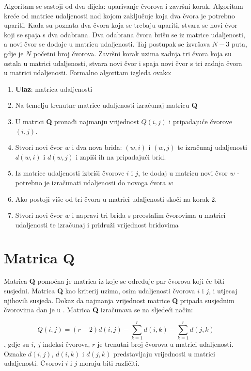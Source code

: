 \documentclass[times, utf8, seminar, numeric]{fer}
\begin{document}
Algoritam se sastoji od dva dijela: uparivanje čvorova i završni korak. Algoritam kreće od matrice udaljenosti nad kojom zaključuje koja dva čvora je potrebno upariti. Kada su poznata dva čvora koja se trebaju upariti, stvara se novi čvor koji se spaja s dva odabrana. Dva odabrana čvora brišu se iz matrice udaljenosti, a novi čvor se dodaje u matricu udaljenosti. Taj postupak se izvršava $N-3$ puta, gdje je $N$ početni broj čvorova. Završni korak uzima zadnja tri čvora koja su ostala u matrici udaljenosti, stvara novi čvor i spaja novi čvor s tri zadnja čvora u matrici udaljenosti. Formalno algoritam izgleda ovako:
\begin{enumerate}
	\item \textbf{Ulaz}: matrica udaljenosti
	\item Na temelju trenutne matrice udaljenosti izračunaj matricu \textbf{Q}
	\item U matrici \textbf{Q} pronađi najmanju vrijednost $Q(i,j)$ i pripadajuće čvorove $(i,j)$.
	\item Stvori novi čvor $w$ i dva nova brida: $(w,i)$ i $(w,j)$ te izračunaj udaljenosti $d(w,i)$ i $d(w,j)$ i zapiši ih na pripadajući brid.
	\item Iz matrice udaljenosti izbriši čvorove $i$ i $j$, te dodaj u matricu novi čvor $w$ - potrebno je izračunati udaljenosti do novoga čvora $w$
	\item Ako postoji više od tri čvora u matrici udaljenosti skoči na korak 2.
	\item Stvori novi čvor $w$ i napravi tri brida s preostalim čvorovima u matrici udaljenosti te izračunaj i pridruži vrijednost bridovima 
\end{enumerate}

\section{Matrica Q}
Matrica \textbf{Q} pomoćna je matrica iz koje se određuje par čvorova koji će biti susjedni. Matrica \textbf{Q} kao kriterij uzima, osim udaljenosti čvorova $i$ i $j$, i utjecaj njihovih susjeda. Dokaz da najmanja vrijednost matrice \textbf{Q} pripada susjednim čvorovima dan je u \cite{saitou}. Matrica \textbf{Q} izračunava se na sljedeći način:

\begin{equation}
	Q(i,j) = (r-2) d(i,j) - \sum_{k=1}^{r}d(i,k) - \sum_{k=1}^{r}d(j,k)
\end{equation}
, gdje su $i$, $j$ indeksi čvorova, $r$ je trenutni broj čvorova u matrici udaljenosti. Oznake $d(i,j)$, $d(i,k)$ i $d(j,k)$ predstavljaju vrijednosti u matrici udaljenosti. Čvorovi $i$ i $j$ moraju biti različiti.
\end{document}
